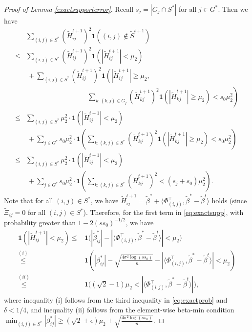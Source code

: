 \documentclass[12pt]{article}
\newtheorem{proof}{Proof}
\begin{document}
\begin{appendix}
\begin{proof}[Proof of Lemma \ref{exactsupporterror}]
Recall $s_j = |{G_j} \cap S^* |$ for all $ j \in G^*$.
Then we have
\begin{equation}\label{eq:exactsupp}
    \begin{aligned}
    & \sum_{ (i,j) \in S^* } \left( \tilde H_{ij}^{t+1}\right)^2 
         \mathbf1\left( (i,j) \notin \tilde S^{t+1}\right) \\
    \le &  \sum_{(i,j) \in S^*} \left( \tilde H_{ij}^{t+1}\right)^2 
         \mathbf1\left( |\tilde H_{ij}^{t+1}| < \mu_2 \right)  \\
    &~+  \sum_{(i,j) \in S^*} \left( \tilde H_{ij}^{t+1}\right)^2 
         \mathbf1\left( |\tilde H_{ij}^{t+1}| \ge \mu_2, \right.\\
         & \qquad\qquad\qquad\qquad\quad \left.
         \sum_{k: (k,j) \in G_j}\left( \tilde H_{kj}^{t+1}\right)^2  \mathbf1 ( |\tilde H_{kj}^{t+1}| \ge \mu_2) < s_0 \mu_2^2 \right) \\
    \le &  \sum_{(i,j) \in S^*} \mu_2^2 \cdot \mathbf1\left( |\tilde H_{ij}^{t+1}| <\mu_2 \right) \\
        &~+  \sum_{j \in G^*}  s_0 \mu_2^2 \cdot 
         \mathbf1\left( \sum_{k: (k,j) \in S^*}\left( \tilde H_{kj}^{t+1}\right)^2 \mathbf1 (|\tilde H_{kj}^{t+1}| \ge \mu_2)< s_0 \mu_2^2 \right) \\
    \le &  \sum_{(i,j) \in S^*} \mu_2^2 \cdot
         \mathbf1\left( |\tilde H_{ij}^{t+1}| < \mu_2 \right) \\
         &~+ \sum_{j \in G^*} s_0 \mu_2^2 \cdot 
         \mathbf1\left( \sum_{k: (k,j) \in S^*}\left( \tilde H_{kj}^{t+1}\right)^2 < (s_j+s_0) \mu_2^2 \right).
    \end{aligned}
\end{equation}
Note that for all $ (i,j) \in S^*$, we have $\tilde H_{ij}^{t+1} = \tilde \beta^* + \langle{\Phi}_{(i,j)}^\top,\tilde\beta^*-\tilde\beta^{t}\rangle$ holds (since $\tilde \Xi_{ij} =0$ for all $ (i,j) \in S^*$).
Therefore, for the first term in \eqref{eq:exactsupp}, with probability greater than $1 - 2 (ss_0)^{-1/2}$, we have 
\begin{equation}\label{eq:exactsupport1}
\begin{aligned}
\mathbf1\left( |\tilde H_{ij}^{t+1}| < \mu_2 \right) 
\le & \mathbf 1\Big( |\tilde \beta_{ij}^*| - | \langle{\Phi}_{(i,j)}^\top,\tilde\beta^*-\tilde\beta^{t}\rangle | < \mu_2 \Big) \\ 
\overset{(i)}{\le} & \mathbf 1\left( |\beta_{ij}^*|- \sqrt{\frac{4\sigma^2 \log(ss_0)}{n}} -|\langle{\Phi}_{(i,j)}^\top, \tilde\beta^*-\tilde\beta^{t}\rangle| < \mu_2  \right)\\
\overset{(ii)}{\le} & \mathbf 1\Big( (\sqrt2-1 ) \mu_2 < |\langle{\Phi}_{(i,j)}^\top, \tilde\beta^*-\tilde\beta^{t}\rangle| \Big), 
\end{aligned}
\end{equation}
where inequality (i) follows from the third inequality in \eqref{eq:exactprob} and $\delta < 1/4$, and inequality (ii) follows from the element-wise beta-min condition $\min_{(i,j) \in S^*} |\beta_{ij}^*| \ge (\sqrt2 + \epsilon)\mu_2 + \sqrt{\frac{4\sigma^2 \log (ss_0)}{n}}$.


\end{proof}
\end{appendix}
\end{document}
